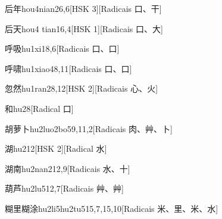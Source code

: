 \begin{entry}{后年}{hou4nian2}{6,6}[HSK 3][Radicais ⼝、⼲]
\end{entry}

\begin{entry}{后天}{hou4 tian1}{6,4}[HSK 1][Radicais ⼝、⼤]
\end{entry}

\begin{entry}{呼吸}{hu1xi1}{8,6}[Radicais ⼝、⼝]
\end{entry}

\begin{entry}{呼啸}{hu1xiao4}{8,11}[Radicais ⼝、⼝]
\end{entry}

\begin{entry}{忽然}{hu1ran2}{8,12}[HSK 2][Radicais ⼼、⽕]
\end{entry}

\begin{entry}{和}{hu2}{8}[Radical ⼝]
\end{entry}

\begin{entry}{胡萝卜}{hu2luo2bo5}{9,11,2}[Radicais ⾁、⾋、⼘]
\end{entry}

\begin{entry}{湖}{hu2}{12}[HSK 2][Radical ⽔]
\end{entry}

\begin{entry}{湖南}{hu2nan2}{12,9}[Radicais ⽔、⼗]
\end{entry}

\begin{entry}{葫芦}{hu2lu5}{12,7}[Radicais ⾋、⾋]
\end{entry}

\begin{entry}{糊里糊涂}{hu2li5hu2tu5}{15,7,15,10}[Radicais ⽶、⾥、⽶、⽔]
\end{entry}

